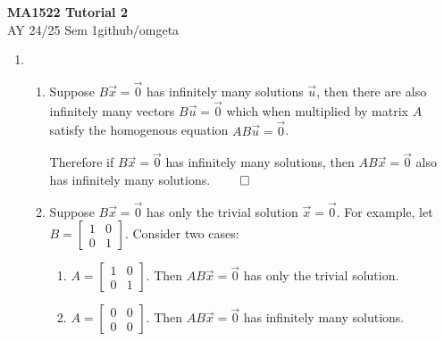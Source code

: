 \documentclass[12pt, a4paper]{article}
\newcommand{\mytitle}{MA1522 Tutorial 2}
\newcommand{\myauthor}{github/omgeta}
\newcommand{\mydate}{AY 24/25 Sem 1}
\begin{document}
\raggedright
\footnotesize
\begin{center}
{\normalsize{\textbf{\mytitle}}} \\
{\footnotesize{\mydate\hspace{2pt}\textemdash\hspace{2pt}\myauthor}}
\end{center}

\begin{enumerate}[Q\arabic*.]
  \item
    \begin{enumerate}[(\alph*)]
      \item Suppose $B \vec{x} = \vec{0}$ has infinitely many solutions $\vec{u}$, then there are also infinitely many vectors $B\vec{u} = \vec{0}$ which when multiplied by matrix $A$ satisfy the homogenous equation $AB \vec{u} = \vec{0}$. 

        Therefore if $B\vec{x} = \vec{0}$ has infinitely many solutions, then $AB \vec{x} = \vec{0}$ also has infinitely many solutions. $\qed$
      \item Suppose $B \vec{x} = \vec{0}$ has only the trivial solution $\vec{x} = \vec{0}$. For example, let $B = \begin{bmatrix}1&0\\0&1\end{bmatrix}$. Consider two cases:
        \begin{enumerate}[(\roman*)]
          \item $A = \begin{bmatrix}1&0\\0&1\end{bmatrix}$. Then $AB \vec{x} = \vec{0}$ has only the trivial solution.
          \item $A = \begin{bmatrix}0&0\\0&0\end{bmatrix}$. Then $AB \vec{x} = \vec{0}$ has infinitely many solutions.
        \end{enumerate}


\end{enumerate}
\end{enumerate}
\end{document}

